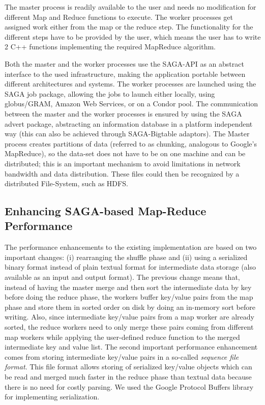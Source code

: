 \documentclass[3p,twocolumn]{elsarticle}
\begin{document}
The master process is readily available to the user and needs no
modification for different Map and Reduce functions to execute.  The
worker processes get assigned work either from the map or the reduce
step. The functionality for the different steps have to be provided by
the user, which means the user has to write 2 C++ functions
implementing the required MapReduce algorithm.

Both the master and the worker processes use the SAGA-API as an
abstract interface to the used infrastructure, making the application
portable between different architectures and systems. The worker
processes are launched using the SAGA job package, allowing the jobs
to launch either locally, using globus/GRAM, Amazon Web Services, or
on a Condor pool. The communication between the master and the worker
processes is ensured by using the SAGA advert package, abstracting an
information database in a platform independent way (this can also be
achieved through SAGA-Bigtable adaptors).  The Master process creates
partitions of data (referred to as chunking, analogous to Google's
MapReduce), so the data-set does not have to be on one machine and can
be distributed; this is an important mechanism to avoid limitations in
network bandwidth and data distribution.  These files could then be
recognized by a distributed File-System, such as HDFS.

\subsection{Enhancing SAGA-based Map-Reduce Performance}


The performance enhancements to the existing \sagamapreduce implementation
are based on two important changes: (i) rearranging the shuffle phase and (ii)
using a serialized binary format instead of plain textual format for intermediate
data storage (also available as an input and output format).  The previous
change means that, instead of having the master merge and then sort the
intermediate data by key before doing the reduce phase, the workers buffer
key/value pairs from the map phase and store them in sorted order
on disk by doing an in-memory sort before writing. Also, since intermediate
key/value pairs from a map worker are already sorted, the reduce workers need
to only merge these pairs coming from different map workers while applying the
user-defined reduce function to the merged intermediate key and value list.
The second important performance enhancement comes from storing intermediate
key/value pairs in a so-called \emph{sequence file format}. This file format
allows storing of serialized key/value objects which can be read and merged
much faster in the reduce phase than textual data because there is no need for
costly parsing.  We used the Google Protocol Buffers library for implementing
serialization.
\end{document}
